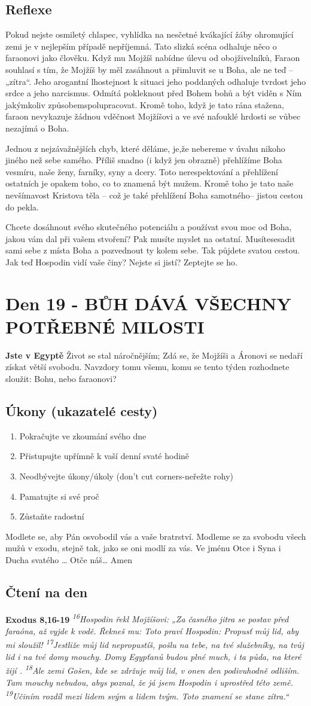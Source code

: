 \documentclass[11pt]{article}
\newcommand{\zacatekTretiTyden}{
  \textbf{Jste v Egyptě} \newline
  Život se stal náročnějším; Zdá se, že Mojžíši a Áronovi se nedaří získat větší svobodu. Navzdory tomu všemu,
komu se tento týden rozhodnete sloužit: Bohu, nebo faraonovi?

\subsection*{Úkony (ukazatelé cesty)}
\begin{enumerate}
  \item Pokračujte ve zkoumání svého dne
  \item Přistupujte upřímně k vaší denní svaté hodině
  \item Neodbývejte úkony/úkoly (don’t cut corners-neřežte rohy)
  \item Pamatujte si své proč
  \item Zůstaňte radostní
\end{enumerate}
Modlete se, aby Pán osvobodil vás a vaše bratrství. \newline
Modleme se za svobodu všech mužů v exodu, stejně tak, jako se oni modlí za vás.\newline
Ve jménu Otce i Syna i Ducha svatého …  Otče náš… Amen
}
\begin{document}
\subsection*{Reflexe}

Pokud nejste osmiletý chlapec, vyhlídka na nesčetné kvákající žáby ohromující zemi je v nejlepším případě
nepříjemná. Tato slizká scéna odhaluje něco o faraonovi jako člověku. Když mu Mojžíš nabídne úlevu od
obojživelníků, Faraon souhlasí s tím, že Mojžíš by měl zasáhnout a přimluvit se u Boha, ale ne teď – „zítra“. Jeho
arogantní lhostejnost k situaci jeho poddaných odhaluje tvrdost jeho srdce a jeho narcismus. Odmítá pokleknout
před Bohem bohů a být viděn s Ním jakýmkoliv způsobemspolupracovat. Kromě toho, když je tato rána stažena,
faraon nevykazuje žádnou vděčnost Mojžíšovi a ve své nafouklé hrdosti se vůbec nezajímá o Boha.

Jednou z nejzávažnějších chyb, které děláme, je,že nebereme v úvahu nikoho jiného než sebe samého. Příliš snadno
(i když jen obrazně) přehlížíme Boha vesmíru, naše ženy, farníky, syny a dcery. Toto nerespektování a přehlížení
ostatních je opakem toho, co to znamená být mužem. Kromě toho je tato naše nevšímavost Kristova těla – což je
také přehlížení Boha samotného– jistou cestou do pekla.

Chcete dosáhnout svého skutečného potenciálu a používat svou moc od Boha, jakou vám dal při vašem stvoření?
Pak musíte myslet na ostatní. Musítesesadit sami sebe z místa Boha a pozvednout ty kolem sebe. Tak půjdete
svatou cestou. Jak teď Hospodin vidí vaše činy? Nejste si jistí? Zeptejte se ho.

\newpage
\section{Den 19 - BŮH DÁVÁ VŠECHNY POTŘEBNÉ MILOSTI}
\zacatekTretiTyden
\subsection*{Čtení na den}
\textbf{Exodus 8,16-19}
\newline
\textit{
\textsuperscript{16}Hospodin řekl Mojžíšovi: „Za časného jitra se postav před faraóna, až vyjde k vodě. Řekneš mu: Toto praví Hospodin: Propusť můj lid, aby mi sloužil!
\textsuperscript{17}Jestliže můj lid nepropustíš, pošlu na tebe, na tvé služebníky, na tvůj lid i na tvé domy mouchy. Domy Egypťanů budou plné much, i ta půda, na které žijí .
\textsuperscript{18}Ale zemi Gošen, kde se zdržuje můj lid, v onen den podivuhodně odliším. Tam mouchy nebudou, abys poznal, že já jsem Hospodin i uprostřed této země.
\textsuperscript{19}Učiním rozdíl mezi lidem svým a lidem tvým. Toto znamení se stane zítra.“
}
\end{document}
